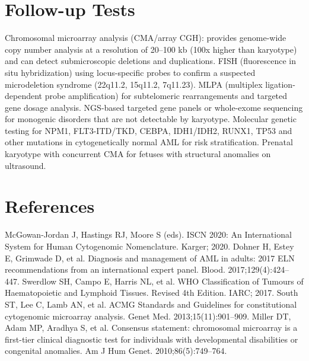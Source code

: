 \section*{Follow-up Tests}
Chromosomal microarray analysis (CMA/array CGH): provides genome-wide copy number analysis at a resolution of 20--100 kb (100x higher than karyotype) and can detect submicroscopic deletions and duplications. FISH (fluorescence in situ hybridization) using locus-specific probes to confirm a suspected microdeletion syndrome (22q11.2, 15q11.2, 7q11.23). MLPA (multiplex ligation-dependent probe amplification) for subtelomeric rearrangements and targeted gene dosage analysis. NGS-based targeted gene panels or whole-exome sequencing for monogenic disorders that are not detectable by karyotype. Molecular genetic testing for NPM1, FLT3-ITD/TKD, CEBPA, IDH1/IDH2, RUNX1, TP53 and other mutations in cytogenetically normal AML for risk stratification. Prenatal karyotype with concurrent CMA for fetuses with structural anomalies on ultrasound.

\section*{References}
McGowan-Jordan J, Hastings RJ, Moore S (eds). ISCN 2020: An International System for Human Cytogenomic Nomenclature. Karger; 2020. Dohner H, Estey E, Grimwade D, et al. Diagnosis and management of AML in adults: 2017 ELN recommendations from an international expert panel. Blood. 2017;129(4):424--447. Swerdlow SH, Campo E, Harris NL, et al. WHO Classification of Tumours of Haematopoietic and Lymphoid Tissues. Revised 4th Edition. IARC; 2017. South ST, Lee C, Lamb AN, et al. ACMG Standards and Guidelines for constitutional cytogenomic microarray analysis. Genet Med. 2013;15(11):901--909. Miller DT, Adam MP, Aradhya S, et al. Consensus statement: chromosomal microarray is a first-tier clinical diagnostic test for individuals with developmental disabilities or congenital anomalies. Am J Hum Genet. 2010;86(5):749--764.

\clearpage

